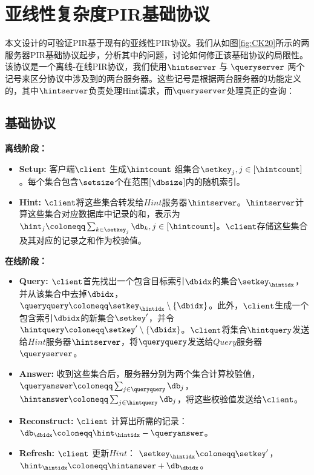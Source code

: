 \section{亚线性复杂度PIR基础协议}
本文设计的可验证PIR基于现有的亚线性PIR协议\cite{EC:CorKog20, C:LazPap23}。我们从如图\ref{fig:CK20}所示的两服务器PIR基础协议起步，分析其中的问题，讨论如何修正该基础协议的局限性。该协议是一个离线-在线PIR协议，我们使用$\hintserver$ 与 $\queryserver$ 两个记号来区分协议中涉及到的两台服务器。这些记号是根据两台服务器的功能定义的，其中$\hintserver$负责处理Hint请求，而$\queryserver$处理真正的查询：

\subsection{基础协议}

\noindent \textbf{离线阶段：}
\begin{itemize}
\item \textbf{Setup:} 客户端$\client$ 生成$\hintcount$ 组集合$\setkey_j, j\in[\hintcount]$。每个集合包含$\setsize$个在范围[$\dbsize$]内的随机索引。
\item \textbf{Hint:} $\client$将这些集合转发给$Hint$服务器$\hintserver$。$\hintserver$计算这些集合对应数据库中记录的和，表示为$\hint_j \coloneqq \sum_{k\in \setkey_j} \db_k, j \in [\hintcount]$。$\client$存储这些集合及其对应的记录之和作为校验值。
\end{itemize}

\noindent \textbf{在线阶段：}
\begin{itemize}
\item \textbf{Query:} $\client$首先找出一个包含目标索引$\dbidx$的集合$\setkey_\hintidx$，并从该集合中去掉$\dbidx$，$\queryquery \coloneqq \setkey_\hintidx \setminus \{\dbidx\}$。此外，$\client$生成一个包含索引$\dbidx$的新集合$\setkey'$，并令$\hintquery \coloneqq \setkey' \setminus \{\dbidx\}$。$\client$将集合$\hintquery$发送给$Hint$服务器$\hintserver$，将$\queryquery$发送给$Query$服务器$\queryserver$。
\item \textbf{Answer:} 收到这些集合后，服务器分别为两个集合计算校验值，$\queryanswer\coloneqq \sum_{j\in \queryquery}\db_j$，$\hintanswer\coloneqq \sum_{j\in \hintquery}\db_j$，将这些校验值发送给$\client$。
\item \textbf{Reconstruct:} $\client$ 计算出所需的记录：$\db_\dbidx \coloneqq \hint_\hintidx - \queryanswer$。
\item \textbf{Refresh:} $\client$ 更新$Hint$： $\setkey_\hintidx \coloneqq \setkey'$，$\hint_\hintidx \coloneqq \hintanswer+\db_\dbidx$。
\end{itemize}


